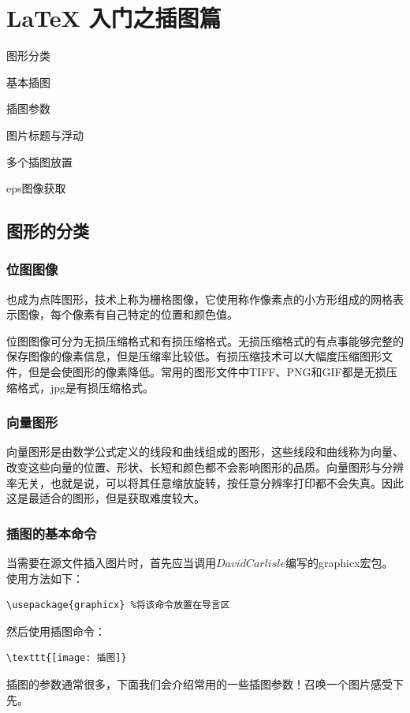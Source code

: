 \documentclass[cn,chinese,color=cyan]{elegantbook}
\begin{document}
\chapter{LaTeX 入门之插图篇}
\begin{introduction}
	\item 图形分类
	\item 基本插图
	\item 插图参数
	\item 图片标题与浮动
	\item 多个插图放置
	\item eps图像获取
\end{introduction}
\section{图形的分类}

\subsection{位图图像}
也成为点阵图形，技术上称为栅格图像，它使用称作像素点的小方形组成的网格表示图像，每个像素有自己特定的位置和颜色值。

位图图像可分为无损压缩格式和有损压缩格式。无损压缩格式的有点事能够完整的保存图像的像素信息，但是压缩率比较低。有损压缩技术可以大幅度压缩图形文件，但是会使图形的像素降低。常用的图形文件中TIFF、PNG和GIF都是无损压缩格式，jpg是有损压缩格式。

\subsection{向量图形}

向量图形是由数学公式定义的线段和曲线组成的图形，这些线段和曲线称为向量、改变这些向量的位置、形状、长短和颜色都不会影响图形的品质。向量图形与分辨率无关，也就是说，可以将其任意缩放旋转，按任意分辨率打印都不会失真。因此这是最适合的图形，但是获取难度较大。

\subsection{插图的基本命令}
当需要在源文件插入图片时，首先应当调用$David Carlisle$编写的graphicx宏包。
使用方法如下：
\begin{lstlisting}[style=R]
\usepackage{graphicx} %将该命令放置在导言区
\end{lstlisting}
然后使用插图命令：
\begin{lstlisting}[style=R]
\texttt{[image: 插图]}
\end{lstlisting}
\begin{note}
	插图的参数通常很多，下面我们会介绍常用的一些插图参数！召唤一个图片感受下先。
\end{note}
\end{document}
